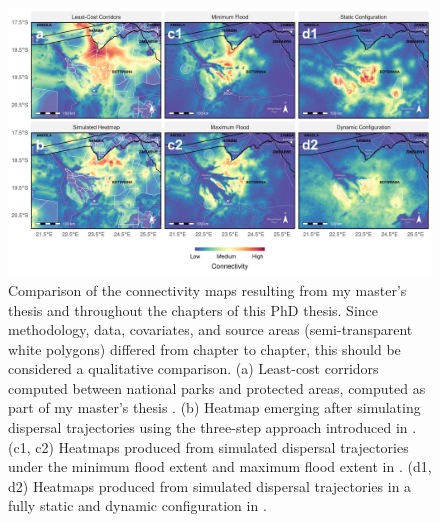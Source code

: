 \documentclass[../FinalThesis.tex]{subfiles}
\begin{document}
\begin{figure}[htpb]
  \begin{center}
  \includegraphics[width = \textwidth]{Figures/MapComparison.pdf}
  \caption{Comparison of the connectivity maps resulting from my master's thesis
  and throughout the chapters of this PhD thesis. Since methodology, data,
  covariates, and source areas (semi-transparent white polygons) differed from
  chapter to chapter, this should be considered a qualitative comparison. (a)
  Least-cost corridors computed between national parks and protected areas,
  computed as part of my master's thesis \citep{Hofmann.2023}. (b) Heatmap
  emerging after simulating dispersal trajectories using the three-step approach
  introduced in . (c1, c2) Heatmaps produced from
  simulated dispersal trajectories under the minimum flood extent and maximum
  flood extent in . (d1, d2) Heatmaps produced from simulated
  dispersal trajectories in a fully static and dynamic configuration in
  .}
  \label{MapComparisonChapters}
  \end{center}
\end{figure}
\end{document}
